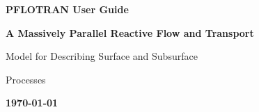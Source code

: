 \begin{center}

\dblline

\vspace{1 cm}

{\bf\huge PFLOTRAN User Guide}

\vspace{1cm}

{\bf\LARGE A Massively Parallel Reactive Flow and Transport 

Model for Describing Surface and Subsurface 

Processes}

\vspace{5cm}

{\bf\large\today}

\end{center}

\dblline

